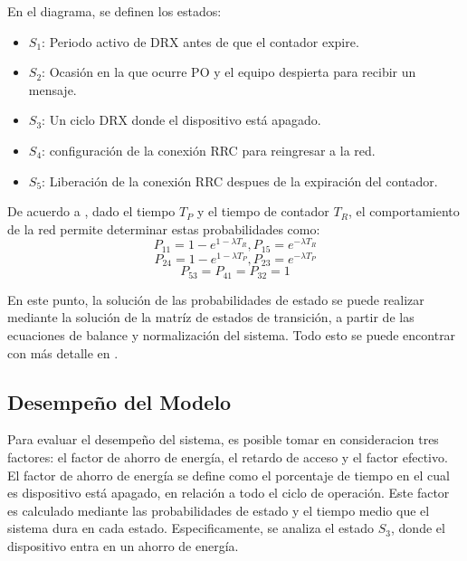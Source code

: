 \documentclass[journal]{IEEEtran}
\begin{document}
En el diagrama, se definen los estados:\\

\begin{itemize}
	\item $S_{1}$: Periodo activo de DRX antes de que el contador expire.
	\item $S_{2}$: Ocasión en la que ocurre PO y el equipo despierta para recibir un mensaje.
	\item $S_{3}$: Un ciclo DRX donde el dispositivo está apagado.
	\item $S_{4}$: configuración de la conexión RRC para reingresar a la red.
	\item $S_{5}$: Liberación de la conexión RRC despues de la expiración del contador.
\end{itemize}

De acuerdo a \cite{paper2}, dado el tiempo $T_{P}$ y el tiempo de contador $T_{R}$, el comportamiento de la red permite determinar estas probabilidades como:\\

\begin{equation}
P_{11}=1-e^{1-\lambda T_{R}}, P_{15}=e^{-\lambda T_{R}}
\end{equation}
\begin{equation}
P_{24}=1-e^{1-\lambda T_{P}}, P_{23}=e^{-\lambda T_{P}}
\end{equation}
\begin{equation}
P_{53}=P_{41}=P_{32}=1
\end{equation}

En este punto, la solución de las probabilidades de estado se puede realizar mediante la solución de la matríz de estados de transición, a partir de las ecuaciones de balance y normalización del sistema. Todo esto se puede encontrar con más detalle en \cite{paper2}.

\subsection{Desempeño del Modelo}

Para evaluar el desempeño del sistema, es posible tomar en consideracion tres factores: el factor de ahorro de energía, el retardo de acceso y el factor efectivo.\\

El factor de ahorro de energía se define como el porcentaje de tiempo en el cual es dispositivo está apagado, en relación a todo el ciclo de operación. Este factor es calculado mediante las probabilidades de estado y el tiempo medio que el sistema dura en cada estado. Especificamente, se analiza el estado $S_{3}$, donde el dispositivo entra en un ahorro de energía.\\
\end{document}
